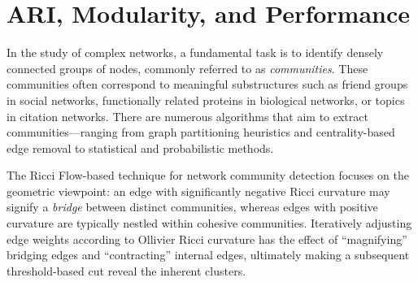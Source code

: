 
\section{ARI, Modularity, and Performance}
\label{sec:ricci_flow_networks}

In the study of complex networks, a fundamental task is to identify densely connected groups of nodes, commonly referred to as \emph{communities}. These communities often correspond to meaningful substructures such as friend groups in social networks, functionally related proteins in biological networks, or topics in citation networks. There are numerous algorithms that aim to extract communities---ranging from graph partitioning heuristics and centrality-based edge removal to statistical and probabilistic methods.

The Ricci Flow-based technique for network community detection focuses on the geometric viewpoint: an edge with significantly negative Ricci curvature may signify a \emph{bridge} between distinct communities, whereas edges with positive curvature are typically nestled within cohesive communities. Iteratively adjusting edge weights according to Ollivier Ricci curvature has the effect of “magnifying” bridging edges and “contracting” internal edges, ultimately making a subsequent threshold-based cut reveal the inherent clusters.

